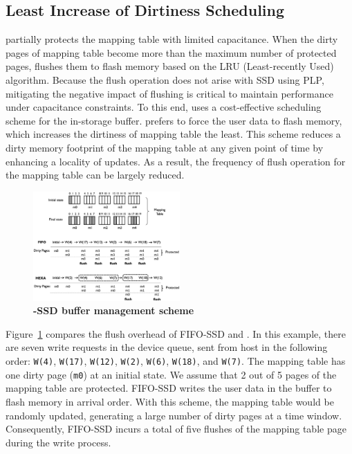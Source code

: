 \subsection{Least Increase of Dirtiness Scheduling}
\label{subsec:lind_sched}
\fi
\ours{} partially protects the mapping table with limited capacitance. 
When the dirty pages of mapping table become more than the maximum number of protected pages, 
\ours{} flushes them to flash memory based on the LRU (Least-recently Used) algorithm. 
Because the flush operation does not arise with SSD using PLP, mitigating the negative impact of  flushing is critical to maintain performance under capacitance constraints. 
To this end, \ours{} uses a cost-effective scheduling scheme for the in-storage buffer.
\ours{} prefers to force the user data to flash memory, which increases the dirtiness of mapping table the least. This scheme reduces a dirty memory footprint 
of the mapping table at any given point of time by enhancing a locality of updates. 
As a result, the frequency of flush operation for the mapping table can be 
largely reduced. 

\begin{figure}
    \centering{}
    \includegraphics[width=0.5\textwidth]{figure/dawid_algo.eps}
    \caption{\textbf{\ours{}-SSD buffer management scheme}}
    \label{fig:dawid_buff_overview}
    \vspace{-20pt}
\end{figure}

Figure~\ref{fig:dawid_buff_overview} compares the flush overhead of FIFO-SSD and \ours{}. 
In this example, there are seven write requests 
in the device queue, sent from host in the following order: \texttt{W(4)}, \texttt{W(17)}, \texttt{W(12)}, \texttt{W(2)}, \texttt{W(6)}, \texttt{W(18)}, and \texttt{W(7)}.  
The mapping table has one dirty page (\texttt{m0}) 
at an initial state. We assume that 2 out of 5 pages of the mapping table are protected. 
FIFO-SSD writes the user data in the buffer to flash memory in arrival order. 
With this scheme, the mapping table would be randomly updated, generating a large number of dirty pages at a 
time window. 
Consequently, FIFO-SSD incurs a total of five flushes of the mapping table page during the write process. 


